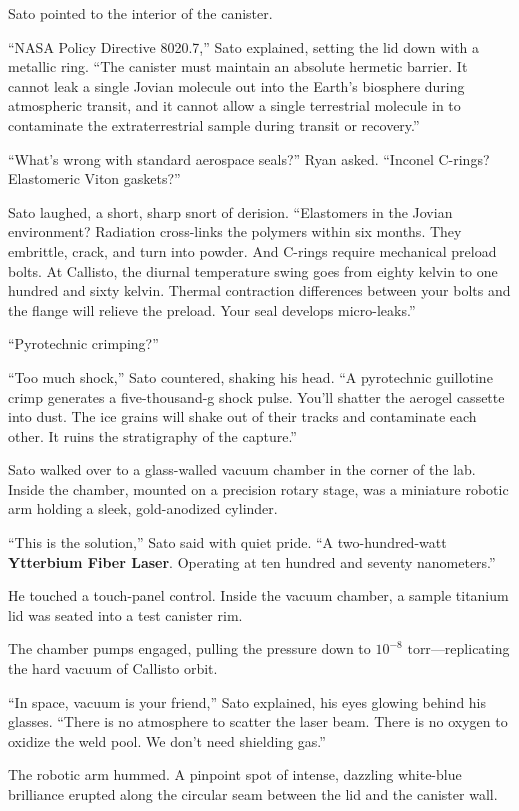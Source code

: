 \documentclass[12pt,twoside,openright]{book}
\begin{document}
Sato pointed to the interior of the canister.

``NASA Policy Directive 8020.7,'' Sato explained, setting the lid down
with a metallic ring. ``The canister must maintain an absolute hermetic
barrier. It cannot leak a single Jovian molecule out into the Earth's
biosphere during atmospheric transit, and it cannot allow a single
terrestrial molecule in to contaminate the extraterrestrial sample
during transit or recovery.''

``What's wrong with standard aerospace seals?'' Ryan asked. ``Inconel
C-rings? Elastomeric Viton gaskets?''

Sato laughed, a short, sharp snort of derision. ``Elastomers in the
Jovian environment? Radiation cross-links the polymers within six
months. They embrittle, crack, and turn into powder. And C-rings require
mechanical preload bolts. At Callisto, the diurnal temperature swing
goes from eighty kelvin to one hundred and sixty kelvin. Thermal
contraction differences between your bolts and the flange will relieve
the preload. Your seal develops micro-leaks.''

``Pyrotechnic crimping?''

``Too much shock,'' Sato countered, shaking his head. ``A pyrotechnic
guillotine crimp generates a five-thousand-g shock pulse. You'll shatter
the aerogel cassette into dust. The ice grains will shake out of their
tracks and contaminate each other. It ruins the stratigraphy of the
capture.''

Sato walked over to a glass-walled vacuum chamber in the corner of the
lab. Inside the chamber, mounted on a precision rotary stage, was a
miniature robotic arm holding a sleek, gold-anodized cylinder.

``This is the solution,'' Sato said with quiet pride. ``A
two-hundred-watt \textbf{Ytterbium Fiber Laser}. Operating at ten
hundred and seventy nanometers.''

He touched a touch-panel control. Inside the vacuum chamber, a sample
titanium lid was seated into a test canister rim.

The chamber pumps engaged, pulling the pressure down to
\(10^{-8}\text{ torr}\)---replicating the hard vacuum of Callisto orbit.

``In space, vacuum is your friend,'' Sato explained, his eyes glowing
behind his glasses. ``There is no atmosphere to scatter the laser beam.
There is no oxygen to oxidize the weld pool. We don't need shielding
gas.''

The robotic arm hummed. A pinpoint spot of intense, dazzling white-blue
brilliance erupted along the circular seam between the lid and the
canister wall.
\end{document}
